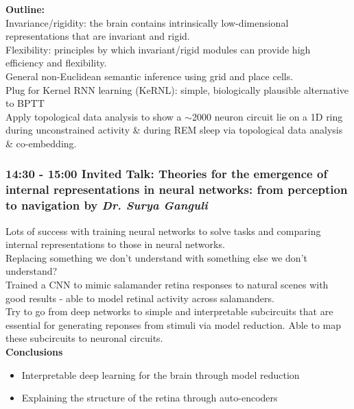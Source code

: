 \documentclass[12pt]{article}
\begin{document}
\textbf{Outline:} \\
Invariance/rigidity: the brain contains intrinsically low-dimensional representations that are invariant and rigid. \\

Flexibility: principles by which invariant/rigid modules can provide high efficiency and flexibility. \\

General non-Euclidean semantic inference using grid and place cells. \\

Plug for Kernel RNN learning (KeRNL): simple, biologically plausible alternative to BPTT \cite{roth2018kernel} \\

Apply topological data analysis to show a $\sim$2000 neuron circuit \cite{Chaudhuri2019} lie on a 1D ring during unconstrained activity \& during REM sleep via topological data analysis \& co-embedding. \\


\subsubsection{14:30 - 15:00 Invited Talk: Theories for the emergence of internal representations in neural networks: from perception to navigation by \textit{Dr. Surya Ganguli}}

Lots of success with training neural networks to solve tasks and comparing internal representations to those in neural networks. \\

Replacing something we don't understand with something else we don't understand? \\

Trained a CNN to mimic salamander retina responses to natural scenes with good results - able to model retinal activity across salamanders. \\

Try to go from deep networks to simple and interpretable subcircuits that are essential for generating reponses from stimuli via model reduction. Able to map these subcircuits to neuronal circuits. \\

\textbf{Conclusions}
\begin{itemize}
\item Interpretable deep learning for the brain through model reduction
\item Explaining the structure of the retina through auto-encoders
\end{itemize}
\end{document}
